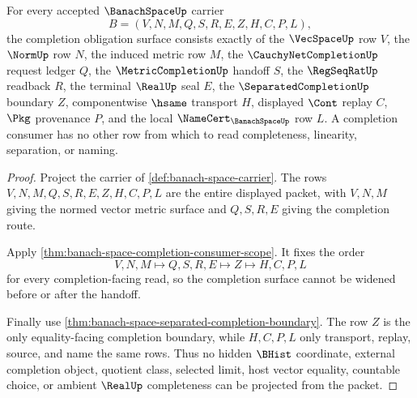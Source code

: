 \begin{theorem}
\label{thm:banach-space-completion-obligation-surface}
For every accepted $\BanachSpaceUp$ carrier
$$
B=(V,N,M,Q,S,R,E,Z,H,C,P,L),
$$
the completion obligation surface consists exactly of the $\VecSpaceUp$ row $V$, the $\NormUp$ row $N$, the induced metric row $M$, the $\CauchyNetCompletionUp$ request ledger $Q$, the $\MetricCompletionUp$ handoff $S$, the $\RegSeqRatUp$ readback $R$, the terminal $\RealUp$ seal $E$, the $\SeparatedCompletionUp$ boundary $Z$, componentwise $\hsame$ transport $H$, displayed $\Cont$ replay $C$, $\Pkg$ provenance $P$, and the local $\NameCert_{\BanachSpaceUp}$ row $L$. A completion consumer has no other row from which to read completeness, linearity, separation, or naming.
\end{theorem}
\begin{proof}
Project the carrier of \autoref{def:banach-space-carrier}. The rows $V,N,M,Q,S,R,E,Z,H,C,P,L$ are the entire displayed packet, with $V,N,M$ giving the normed vector metric surface and $Q,S,R,E$ giving the completion route.

Apply \autoref{thm:banach-space-completion-consumer-scope}. It fixes the order
$$
V,N,M \longmapsto Q,S,R,E \longmapsto Z \longmapsto H,C,P,L
$$
for every completion-facing read, so the completion surface cannot be widened before or after the handoff.

Finally use \autoref{thm:banach-space-separated-completion-boundary}. The row $Z$ is the only equality-facing completion boundary, while $H,C,P,L$ only transport, replay, source, and name the same rows. Thus no hidden $\BHist$ coordinate, external completion object, quotient class, selected limit, host vector equality, countable choice, or ambient $\RealUp$ completeness can be projected from the packet.
\end{proof}

